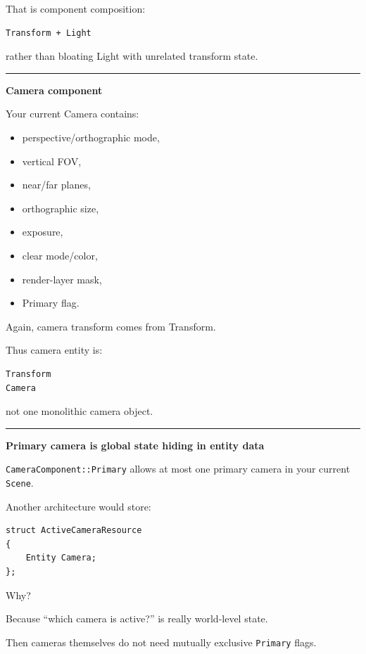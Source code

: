 That is component composition:

\begin{verbatim}
Transform + Light
\end{verbatim}

rather than bloating Light with unrelated transform state.

\begin{center}\rule{0.5\linewidth}{0.5pt}\end{center}

\textbf{Camera component}

Your current Camera contains:

\begin{itemize}
\tightlist
\item
  perspective/orthographic mode,
\item
  vertical FOV,
\item
  near/far planes,
\item
  orthographic size,
\item
  exposure,
\item
  clear mode/color,
\item
  render-layer mask,
\item
  Primary flag.
\end{itemize}

Again, camera transform comes from Transform.

Thus camera entity is:

\begin{verbatim}
Transform
Camera
\end{verbatim}

not one monolithic camera object.

\begin{center}\rule{0.5\linewidth}{0.5pt}\end{center}

\textbf{Primary camera is global state hiding in entity data}

\texttt{CameraComponent::Primary} allows at most one primary camera in your current \texttt{Scene}.

Another architecture would store:

\begin{verbatim}
struct ActiveCameraResource
{
    Entity Camera;
};
\end{verbatim}

Why?

Because ``which camera is active?'' is really world-level state.

Then cameras themselves do not need mutually exclusive \texttt{Primary} flags.

